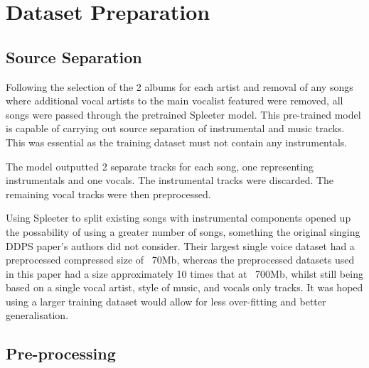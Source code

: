 \section{Dataset Preparation}

\subsection{Source Separation}

Following the selection of the 2 albums for each artist and removal of any songs where additional vocal artists to the main vocalist featured were removed, all songs were passed through the pretrained Spleeter model\cite{SpleeterPip}\cite{SpleeterPip}. This pre-trained model is capable of carrying out source separation of instrumental and music tracks. This was essential as the training dataset must not contain any instrumentals.

The model outputted 2 separate tracks for each song, one representing instrumentals and one vocals. The instrumental tracks were discarded. The remaining vocal tracks were then preprocessed.

Using Spleeter to split existing songs with instrumental components opened up the possability of using a greater number of songs, something the original singing DDPS paper's authors did not consider. Their largest single voice dataset had a preprocessed compressed size of ~70Mb, whereas the preprocessed datasets used in this paper had a size approximately 10 times that at ~700Mb, whilst still being based on a single vocal artist, style of music, and vocals only tracks. It was hoped using a larger training dataset would allow for less over-fitting and better generalisation.

\subsection{Pre-processing}


